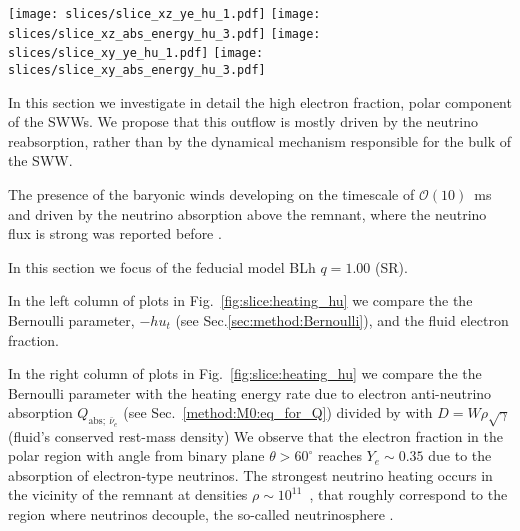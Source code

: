 \begin{figure*}[t]
    \centering 
    \texttt{[image: slices/slice\_xz\_ye\_hu\_1.pdf]}
    \texttt{[image: slices/slice\_xz\_abs\_energy\_hu\_3.pdf]}
    \texttt{[image: slices/slice\_xy\_ye\_hu\_1.pdf]}
    \texttt{[image: slices/slice\_xy\_abs\_energy\_hu\_3.pdf]}
    \caption{Snapshot of the $(x,z)$ and $(x,y)$ slices of the BLh $q=1$ model at 
        ${\sim}89\,$ms after merger. Left panels: electron fraction and
        $-hu_0$. High $Y_e$ values indicate neutrino
        postprocessing and irradiation. The $-hu_0>1$ indicates the
        material that gains enough energy to become unbound at
        infinity. 
        Right: $-hu_0$ and the absorption energy rate $Q_{\text{abs};\:\bar{\nu}_e}$ 
        of electron antineutrinos normalized to the fluid density $D$.
    }
    \label{fig:slice:heating_hu}
\end{figure*}

In this section we investigate in detail the 
high electron fraction, polar component of the \acp{SWW}.
We propose that this outflow is mostly driven by the neutrino 
reabsorption, rather than by the dynamical mechanism responsible for the bulk of the 
\ac{SWW}.

The presence of the baryonic winds developing on the timescale of $\mathcal{O}(10)$~ms
and driven by the neutrino absorption above the remnant, where the neutrino flux is strong 
was reported before \citep[\eg][]{Perego:2014fma}. 

In this section we focus of the feducial model BLh $q=1.00$ (SR). 

In the left column of plots in Fig.~\ref{fig:slice:heating_hu} we compare 
the the Bernoulli parameter, 
$-hu_t$ (see Sec.\ref{sec:method:Bernoulli}), and the fluid electron 
fraction. 

In the right column of plots in Fig.~\ref{fig:slice:heating_hu} we compare 
the the Bernoulli parameter with the heating energy rate due to electron anti-neutrino absorption 
$Q_{\text{abs};\:\bar{\nu}_e}$ (see Sec.~\ref{method:M0:eq_for_Q}) divided by with 
$D=W\rho\sqrt{\gamma}$ (fluid's conserved rest-mass density)
We observe that the electron fraction in the polar region with angle 
from binary plane $\theta>60^{\circ}$ reaches $Y_e\sim0.35$ due to the absorption of 
electron-type neutrinos.
The strongest neutrino heating occurs in the vicinity of the remnant at densities 
$\rho\sim10^{11}$~\gcm, that roughly correspond to the region where neutrinos decouple,
the so-called neutrinosphere \citep{Endrizzi:2019trv}.

